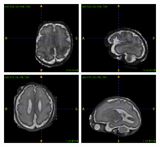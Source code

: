 \begin{figure}[htbp]
    \centering
    \includegraphics[width=0.35\textwidth]{figures/mial_1.png} \quad
    \includegraphics[width=0.35\textwidth]{figures/mial_2.png} \\
    \vspace{10pt}
    \includegraphics[width=0.35\textwidth]{figures/irtk_1.png} \quad
    \includegraphics[width=0.35\textwidth]{figures/irtk_2.png}
    \caption{}
    \label{fig:kispi_images}
\end{figure}
